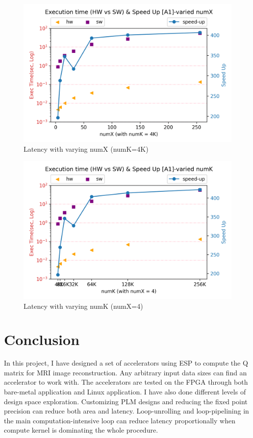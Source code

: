 \documentclass{sig-alternate}
\begin{document}
\begin{figure}[h!]
    \centering
    \includegraphics[width=\columnwidth]{figure/a1-vary-x.png}
    \caption{Latency with varying numX (numK=4K)}
    \label{fig-a1-x}
\end{figure}

\begin{figure}[h!]
    \centering
    \includegraphics[width=\columnwidth]{figure/a1-vary-k.png}
    \caption{Latency with varying numK (numX=4)}
    \label{fig-a1-k}
\end{figure}



\section{Conclusion}
In this project, I have designed a set of accelerators using ESP to compute the Q matrix for MRI image reconstruction. Any arbitrary input data sizes can find an accelerator to work with. The accelerators are tested on the FPGA through both bare-metal application and Linux application. I have also done different levels of design space exploration. Customizing PLM designs and reducing the fixed point precision can reduce both area and latency. Loop-unrolling and loop-pipelining in the main computation-intensive loop can reduce latency proportionally when compute kernel is dominating the whole procedure. 
\end{document}

